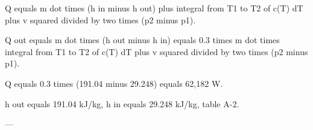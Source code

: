 Q equals m dot times (h in minus h out) plus integral from T1 to T2 of c(T) dT plus v squared divided by two times (p2 minus p1).  

Q out equals m dot times (h out minus h in) equals 0.3 times m dot times integral from T1 to T2 of c(T) dT plus v squared divided by two times (p2 minus p1).  

Q equals 0.3 times (191.04 minus 29.248) equals 62,182 W.  

h out equals 191.04 kJ/kg, h in equals 29.248 kJ/kg, table A-2.  

---
